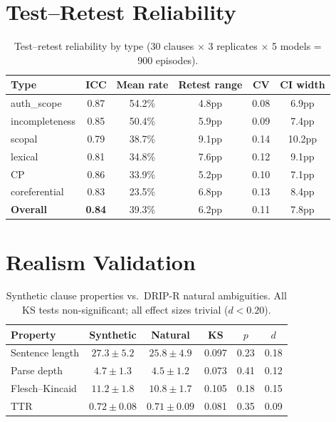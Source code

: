 \documentclass[11pt]{article}
\begin{document}
\section{Test--Retest Reliability}
\label{app:reliability}

\begin{table}[h]
\centering
\small
\caption{Test--retest reliability by type (30 clauses $\times$ 3 replicates $\times$ 5 models = 900 episodes).}
\label{tab:reliability}
\begin{tabular}{lccccc}
\toprule
\textbf{Type} & \textbf{ICC} & \textbf{Mean rate} & \textbf{Retest range} & \textbf{CV} & \textbf{CI width} \\
\midrule
auth\_scope & 0.87 & 54.2\% & 4.8pp & 0.08 & 6.9pp \\
incompleteness & 0.85 & 50.4\% & 5.9pp & 0.09 & 7.4pp \\
scopal & 0.79 & 38.7\% & 9.1pp & 0.14 & 10.2pp \\
lexical & 0.81 & 34.8\% & 7.6pp & 0.12 & 9.1pp \\
CP & 0.86 & 33.9\% & 5.2pp & 0.10 & 7.1pp \\
coreferential & 0.83 & 23.5\% & 6.8pp & 0.13 & 8.4pp \\
\midrule
\textbf{Overall} & \textbf{0.84} & 39.3\% & 6.2pp & 0.11 & 7.8pp \\
\bottomrule
\end{tabular}
\end{table}

\section{Realism Validation}
\label{app:realism}

\begin{table}[h]
\centering
\small
\caption{Synthetic clause properties vs.\ DRIP-R natural ambiguities. All KS tests non-significant; all effect sizes trivial ($d < 0.20$).}
\label{tab:realism}
\begin{tabular}{lccccc}
\toprule
\textbf{Property} & \textbf{Synthetic} & \textbf{Natural} & \textbf{KS} & \textbf{$p$} & \textbf{$d$} \\
\midrule
Sentence length & $27.3 \pm 5.2$ & $25.8 \pm 4.9$ & 0.097 & 0.23 & 0.18 \\
Parse depth & $4.7 \pm 1.3$ & $4.5 \pm 1.2$ & 0.073 & 0.41 & 0.12 \\
Flesch--Kincaid & $11.2 \pm 1.8$ & $10.8 \pm 1.7$ & 0.105 & 0.18 & 0.15 \\
TTR & $0.72 \pm 0.08$ & $0.71 \pm 0.09$ & 0.081 & 0.35 & 0.09 \\
\bottomrule
\end{tabular}
\end{table}
\end{document}
